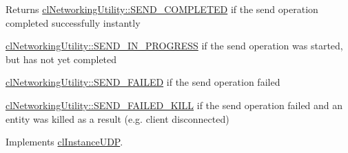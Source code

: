 \begin{DoxyReturn}{Returns}
\hyperlink{classcl_networking_utility_a19389cda12603396e03caa9d82073803abaa42412f2920363cef741fd5b2e202a}{clNetworkingUtility::SEND\_\-COMPLETED} if the send operation completed successfully instantly 

\hyperlink{classcl_networking_utility_a19389cda12603396e03caa9d82073803a807b2f9dcc901c6012549316bccfe407}{clNetworkingUtility::SEND\_\-IN\_\-PROGRESS} if the send operation was started, but has not yet completed 

\hyperlink{classcl_networking_utility_a19389cda12603396e03caa9d82073803a583b1181229130ff739548c8f8de363c}{clNetworkingUtility::SEND\_\-FAILED} if the send operation failed 

\hyperlink{classcl_networking_utility_a19389cda12603396e03caa9d82073803ab06ce588df19988e79b503398b720c79}{clNetworkingUtility::SEND\_\-FAILED\_\-KILL} if the send operation failed and an entity was killed as a result (e.g. client disconnected) 
\end{DoxyReturn}


Implements \hyperlink{classcl_instance_u_d_p_a2a429c537132c699c920b3deb2b96a43}{clInstanceUDP}.

